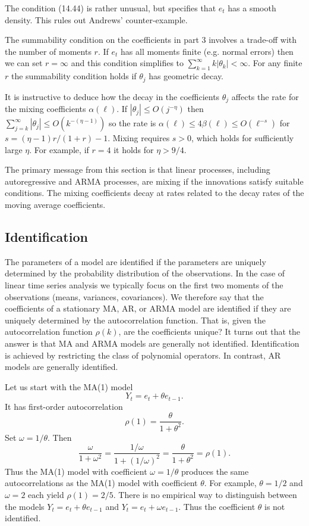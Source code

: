 \documentclass[10pt]{article}
\begin{document}
The condition (14.44) is rather unusual, but specifies that $e_{t}$ has a smooth density. This rules out Andrews' counter-example.

The summability condition on the coefficients in part 3 involves a trade-off with the number of moments $r$. If $e_{t}$ has all moments finite (e.g. normal errors) then we can set $r=\infty$ and this condition simplifies to $\sum_{k=1}^{\infty} k\left|\theta_{k}\right|<\infty$. For any finite $r$ the summability condition holds if $\theta_{j}$ has geometric decay.

It is instructive to deduce how the decay in the coefficients $\theta_{j}$ affects the rate for the mixing coefficients $\alpha(\ell)$. If $\left|\theta_{j}\right| \leq O\left(j^{-\eta}\right)$ then $\sum_{j=k}^{\infty}\left|\theta_{j}\right| \leq O\left(k^{-(\eta-1)}\right)$ so the rate is $\alpha(\ell) \leq 4 \beta(\ell) \leq O\left(\ell^{-s}\right)$ for $s=(\eta-1) r /(1+r)-1$. Mixing requires $s>0$, which holds for sufficiently large $\eta$. For example, if $r=4$ it holds for $\eta>9 / 4$.

The primary message from this section is that linear processes, including autoregressive and ARMA processes, are mixing if the innovations satisfy suitable conditions. The mixing coefficients decay at rates related to the decay rates of the moving average coefficients.

\subsection{Identification}
The parameters of a model are identified if the parameters are uniquely determined by the probability distribution of the observations. In the case of linear time series analysis we typically focus on the first two moments of the observations (means, variances, covariances). We therefore say that the coefficients of a stationary MA, AR, or ARMA model are identified if they are uniquely determined by the autocorrelation function. That is, given the autocorrelation function $\rho(k)$, are the coefficients unique? It turns out that the answer is that MA and ARMA models are generally not identified. Identification is achieved by restricting the class of polynomial operators. In contrast, AR models are generally identified.

Let us start with the MA(1) model
$$
Y_{t}=e_{t}+\theta e_{t-1} .
$$
It has first-order autocorrelation
$$
\rho(1)=\frac{\theta}{1+\theta^{2}} .
$$
Set $\omega=1 / \theta$. Then
$$
\frac{\omega}{1+\omega^{2}}=\frac{1 / \omega}{1+(1 / \omega)^{2}}=\frac{\theta}{1+\theta^{2}}=\rho(1) .
$$
Thus the MA(1) model with coefficient $\omega=1 / \theta$ produces the same autocorrelations as the MA(1) model with coefficient $\theta$. For example, $\theta=1 / 2$ and $\omega=2$ each yield $\rho(1)=2 / 5$. There is no empirical way to distinguish between the models $Y_{t}=e_{t}+\theta e_{t-1}$ and $Y_{t}=e_{t}+\omega e_{t-1}$. Thus the coefficient $\theta$ is not identified.
\end{document}

